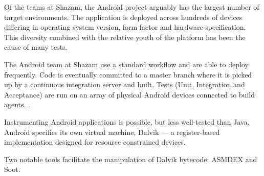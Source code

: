 Of the teams at Shazam, the Android project arguably has the largest number of target environments. The application is deployed across hundreds of devices differing in operating system version, form factor and hardware specification. This diversity combined with the relative youth of the platform has been the cause of many \flaky{} tests.

The Android team at Shazam use a standard workflow and are able to deploy frequently. Code is eventually committed to a master branch where it is picked up by a continuous integration server and built. Tests (Unit, Integration and Acceptance) are run on an array of physical Android devices connected to build agents. .

Instrumenting Android applications is possible, but less well-tested than Java. Android specifies its own virtual machine, Dalvik\cite{dalvik} --- a register-based implementation designed for resource constrained devices.

Two notable tools facilitate the manipulation of Dalvik bytecode; ASMDEX\cite{asmDex} and Soot\cite{vall99soot}.
